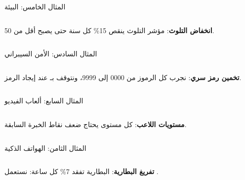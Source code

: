 \begin{frame}[t]{المثال الخامس: البيئة}
    \begin{columns}[T]
        {\small\textbf{انخفاض التلوث}: مؤشر التلوث ينقص 15\% كل سنة حتى يصبح أقل من 50.\par}
        \vspace{0.3cm}
    \end{columns}
\end{frame}

\begin{frame}[t]{المثال السادس: الأمن السيبراني}
    \begin{columns}[T]
        {\small\textbf{تخمين رمز سري}: نجرب كل الرموز من 0000 إلى 9999، ونتوقف بـ عند إيجاد الرمز.\par}
        \vspace{0.3cm}
    \end{columns}
\end{frame}

\begin{frame}[t]{المثال السابع: ألعاب الفيديو}
    \begin{columns}[T]
        {\small\textbf{مستويات اللاعب}: كل مستوى يحتاج ضعف نقاط الخبرة السابقة.\par}
        \vspace{0.3cm}
    \end{columns}
\end{frame}

\begin{frame}[t]{المثال الثامن: الهواتف الذكية}
    \begin{columns}[T]
        {\small\textbf{تفريغ البطارية}: البطارية تفقد 7\% كل ساعة: نستعمل .\par}
        \vspace{0.3cm}
    \end{columns}
\end{frame}

